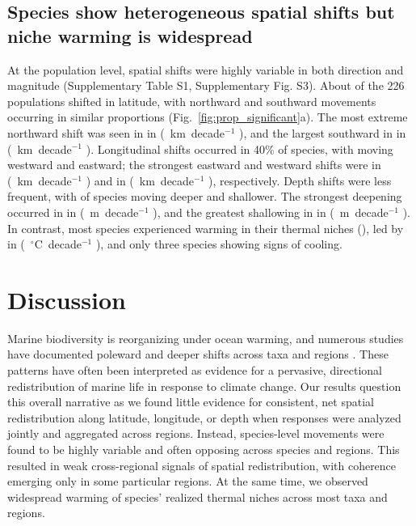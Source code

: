 \documentclass[pdflatex,sn-nature,referee]{sn-jnl}%
\begin{document}
\subsection{Species show heterogeneous spatial shifts but niche warming is widespread}





At the population level, spatial shifts were highly variable in both direction and magnitude (Supplementary Table S1, Supplementary Fig. S3). About \LatPerc{} of the 226 populations shifted in latitude, with northward and southward movements occurring in similar proportions (Fig.~\ref{fig:prop_significant}a). The most extreme northward shift was seen in \MaxLatSpecies{} in \MaxLatRegion{} (\MaxLatMedian{}~km~decade$^{-1}$ \MaxLatCI{}), and the largest southward in \MinLatSpecies{} in \MinLatRegion{} (\MinLatMedian{}~km~decade$^{-1}$ \MinLatCI{}). Longitudinal shifts occurred in 40\% of species, with \LonWestingPerc{} moving westward and \LonEastingPerc{} eastward; the strongest eastward and westward shifts were \MaxLonSpecies{} in \MaxLonRegion{} (\MaxLonMedian{}~km~decade$^{-1}$ \MaxLonCI{}) and \MinLonSpecies{} in \MinLonRegion{} (\MinLonMedian{}~km~decade$^{-1}$ \MinLonCI{}), respectively. Depth shifts were less frequent, with \DepthDeepeningPerc{} of species moving deeper and \DepthShallowingPerc{} shallower. The strongest deepening occurred in \MaxDepthSpecies{} in \MaxDepthRegion{} (\MaxDepthMedian{}~m~decade$^{-1}$ \MaxDepthCI{}), and the greatest shallowing in \MinDepthSpecies{} in \MinDepthRegion{} (\MinDepthMedian{}~m~decade$^{-1}$  \MinDepthCI{}). 
In contrast, most species experienced warming in their thermal niches (\ThermalPerc{}), led by \MaxThermalSpecies{} in \MaxThermalRegion{} (\MaxThermalMedian{}~$^\circ$C~decade$^{-1}$ \MaxThermalCI{}), and only three species showing signs of cooling.


\section{Discussion}\label{sec:Discussion}

Marine biodiversity is reorganizing under ocean warming, and numerous studies have documented poleward and deeper shifts across taxa and regions \citep{poloczanska_global_2013,dulvy_climate_2008,poloczanska_responses_2016, perry_climate_2005}. These patterns have often been interpreted as evidence for a pervasive, directional redistribution of marine life in response to climate change. Our results question this overall narrative as we found little evidence for consistent, net spatial redistribution along latitude, longitude, or depth when responses were analyzed jointly and aggregated across regions. Instead, species-level movements were found to be highly variable and often opposing across species and regions. This resulted in weak cross-regional signals of spatial redistribution, with coherence emerging only in some particular regions. At the same time, we observed widespread warming of species’ realized thermal niches across most taxa and regions.
\end{document}
